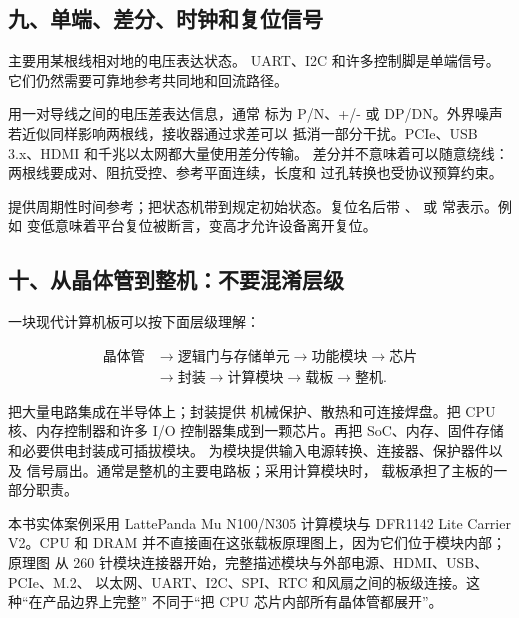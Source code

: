 \subsection{九、单端、差分、时钟和复位信号}

主要用某根线相对地的电压表达状态。
UART、I2C 和许多控制脚是单端信号。它们仍然需要可靠地参考共同地和回流路径。

用一对导线之间的电压差表达信息，通常
标为 P/N、+/- 或 DP/DN。外界噪声若近似同样影响两根线，接收器通过求差可以
抵消一部分干扰。PCIe、USB 3.x、HDMI 和千兆以太网都大量使用差分传输。
差分并不意味着可以随意绕线：两根线要成对、阻抗受控、参考平面连续，长度和
过孔转换也受协议预算约束。

提供周期性时间参考；把状态机带到规定初始状态。复位名后带 \code{\#}、 或
 常表示。例如
 变低意味着平台复位被断言，变高才允许设备离开复位。

\subsection{十、从晶体管到整机：不要混淆层级}

一块现代计算机板可以按下面层级理解：

\[
\begin{aligned}
\text{晶体管}
&\rightarrow \text{逻辑门与存储单元}
\rightarrow \text{功能模块}
\rightarrow \text{芯片}\\
&\rightarrow \text{封装}
\rightarrow \text{计算模块}
\rightarrow \text{载板}
\rightarrow \text{整机}.
\end{aligned}
\]

把大量电路集成在半导体上；封装提供
机械保护、散热和可连接焊盘。把 CPU
核、内存控制器和许多 I/O 控制器集成到一颗芯片。再把 SoC、内存、固件存储和必要供电封装成可插拔模块。
为模块提供输入电源转换、连接器、保护器件以及
信号扇出。通常是整机的主要电路板；采用计算模块时，
载板承担了主板的一部分职责。

本书实体案例采用 LattePanda Mu N100/N305 计算模块与 DFR1142 Lite Carrier
V2。CPU 和 DRAM 并不直接画在这张载板原理图上，因为它们位于模块内部；原理图
从 260 针模块连接器开始，完整描述模块与外部电源、HDMI、USB、PCIe、M.2、
以太网、UART、I2C、SPI、RTC 和风扇之间的板级连接。这种“在产品边界上完整”
不同于“把 CPU 芯片内部所有晶体管都展开”。

